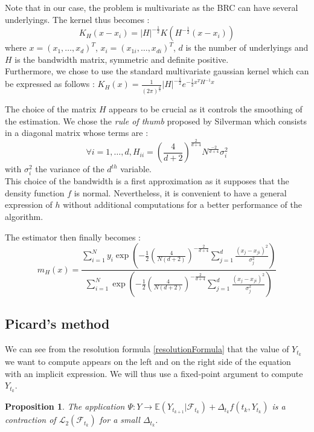 \documentclass[a4paper,11pt,english]{book}
\newtheorem{prop}{Proposition}
\begin{document}
Note that in our case, the problem is multivariate as the BRC can have several underlyings. The kernel thus becomes : $$K_{H}(x-x_{i}) = |H|^{-\frac{1}{2}}K(H^{-\frac{1}{2}}(x-x_{i}))$$
where $x=(x_{1},\ldots,x_{d})^{T}$, $x_{i}=(x_{1i},\ldots,x_{di})^{T}$, $d$ is the number of underlyings and $H$ is the bandwidth matrix, symmetric and definite positive.\\

Furthermore, we chose to use the standard multivariate gaussian kernel which can be expressed as follows :
$K_{H}(x)=\frac{1}{(2\pi)^{\frac{d}{2}}}|H|^{-\frac{1}{2}}e^{-\frac{1}{2}x^{T}H^{-1}x}$

The choice of the matrix $H$ appears to be crucial as it controls the smoothing of the estimation. We chose the \textit{rule of thumb} proposed by Silverman \cite{silverman1986density} which consists in a diagonal matrix whose terms are : $$\forall i=1,\ldots,d, H_{ii} = (\frac{4}{d+2})^{\frac{2}{d+4}}N^{\frac{-2}{d+4}}\sigma_{i}^{2}$$
with $\sigma_{i}^{2}$ the variance of the $d^{th}$ variable.\\

This choice of the bandwidth is a first approximation as it supposes that the density function $f$ is normal. Nevertheless, it is convenient to have a general expression of $h$ without additional computations for a better performance of the algorithm. 

The estimator then finally becomes :
$$\hat{m}_{H}(x)= \frac{\sum_{i=1}^{N}y_{i}\exp\left(-\frac{1}{2}(\frac{4}{N(d+2)})^{-\frac{2}{d+4}}\sum_{j=1}^{d}\frac{(x_{j}-x_{ji})^{2}}{\sigma_{j}^{2}}\right)}{\sum_{i=1}^{N}\exp\left(-\frac{1}{2}(\frac{4}{N(d+2)})^{-\frac{2}{d+4}}\sum_{j=1}^{d}\frac{(x_{j}-x_{ji})^{2}}{\sigma_{j}^{2}}\right)}$$
\subsection{Picard's method}
We can see from the resolution formula \eqref{resolutionFormula} that the value of $Y_{t_{k}}$ we want to compute appears on the left and on the right side of the equation with an implicit expression. We will thus use a fixed-point argument to compute $Y_{t_{k}}$.

\begin{prop}
The application $\Psi : Y \rightarrow \mathbb{E}(Y_{t_{k+1}}|\mathcal{F}_{t_{k}}) + \Delta_{t_k}f(t_{k},Y_{t_{k}})$ is a contraction of $\mathcal{L}_{2}(\mathcal{F}_{t_{k}})$ for a small $\Delta_{t_{k}}$.
\end{prop}
\end{document}
